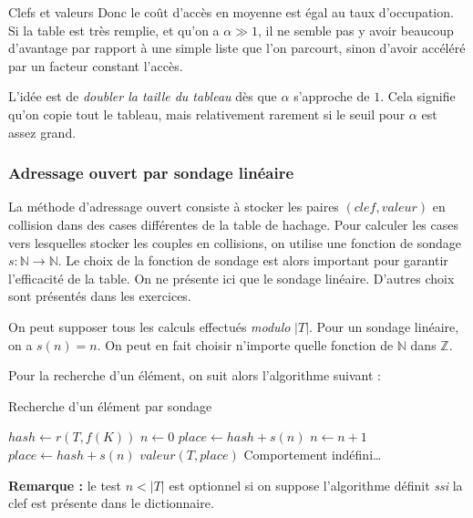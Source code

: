 \documentclass[../../../main.tex]{subfiles}
\begin{document}
\begin{definition}{Clefs et valeurs}
Donc le coût d'accès en moyenne est égal au taux d'occupation. Si la table est très remplie, et qu'on a $\alpha \gg 1$, il ne semble pas y avoir beaucoup d'avantage par rapport à une simple liste que l'on parcourt, sinon d'avoir accéléré par un facteur constant l'accès.

L'idée est de \textit{doubler la taille du tableau} dès que $\alpha$ s'approche de $1$. Cela signifie qu'on copie tout le tableau, mais relativement rarement si le seuil pour $\alpha$ est assez grand.
\subsubsection{Adressage ouvert par sondage linéaire}
La méthode d'adressage ouvert consiste à stocker les paires $(clef, valeur)$ en collision dans des cases différentes de la table de hachage. Pour calculer les cases vers lesquelles stocker les couples en collisions, on utilise une fonction de sondage $s:\mathbb{N}\rightarrow \mathbb{N}$. Le choix de la fonction de sondage est alors important pour garantir l'efficacité de la table. On ne présente ici que le sondage linéaire. D'autres choix sont présentés dans les exercices.

\begin{minipage}{\textwidth}
	\begin{center}
		
	\end{center}
\end{minipage}

On peut supposer tous les calculs effectués \textit{modulo} $|T|$. Pour un sondage linéaire, on a $s(n) = n$. On peut en fait choisir n'importe quelle fonction de $\mathbb{N}$ dans $\mathbb{Z}$.

Pour la recherche d'un élément, on suit alors l'algorithme suivant :\newline

\begin{algorithm}
\caption{Recherche d'un élément par sondage}\label{alg:dict_sondage}
$hash \leftarrow r(T, f(K))$\;
$n \leftarrow 0$\;
$place \leftarrow hash + s(n)$\;
 {
	$n\leftarrow n + 1$\;
	$place\leftarrow hash + s(n)$\;
}
 {
	\Return $valeur(T, place)$\;
} {
	Comportement indéfini\dots {}
}
\end{algorithm}

\textbf{Remarque :} le test $n < |T|$ est optionnel si on suppose l'algorithme définit \textit{ssi} la clef est présente dans le dictionnaire.


\end{definition}
\end{document}
